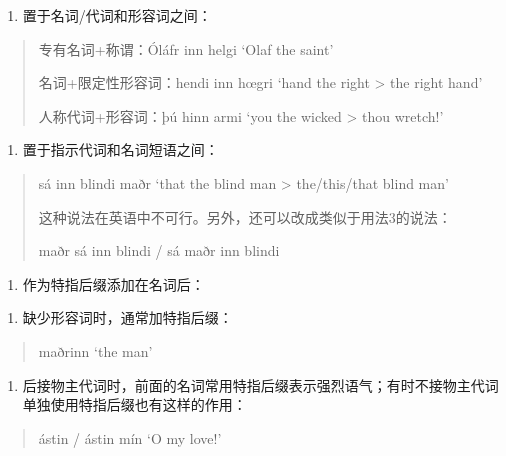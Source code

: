 \begin{enumerate}
  \def\labelenumi{\arabic{enumi})}
  \setcounter{enumi}{2}
  \item
        置于名词/代词和形容词之间：
\end{enumerate}

\begin{quote}
  专有名词+称谓：Óláfr inn helgi `Olaf the saint'

  名词+限定性形容词：hendi inn hœgri `hand the right \textgreater{} the
  right hand'

  人称代词+形容词：þú hinn armi `you the wicked \textgreater{} thou
  wretch!'
\end{quote}

\begin{enumerate}
  \def\labelenumi{\arabic{enumi})}
  \setcounter{enumi}{3}
  \item
        置于指示代词和名词短语之间：
\end{enumerate}

\begin{quote}
  sá inn blindi maðr `that the blind man \textgreater{} the/this/that
  blind man'

  这种说法在英语中不可行。另外，还可以改成类似于用法3的说法：

  maðr sá inn blindi / sá maðr inn blindi
\end{quote}

\begin{enumerate}
  \def\labelenumi{\Alph{enumi}.}
  \setcounter{enumi}{1}
  \item
        作为特指后缀添加在名词后：
\end{enumerate}

\begin{enumerate}
  \def\labelenumi{\arabic{enumi})}
  \item
        缺少形容词时，通常加特指后缀：
\end{enumerate}

\begin{quote}
  maðrinn `the man'
\end{quote}

\begin{enumerate}
  \def\labelenumi{\arabic{enumi})}
  \setcounter{enumi}{1}
  \item
        后接物主代词时，前面的名词常用特指后缀表示强烈语气；有时不接物主代词单独使用特指后缀也有这样的作用：
\end{enumerate}

\begin{quote}
  ástin / ástin mín `O my love!'
\end{quote}

